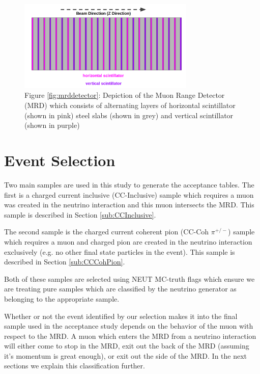 \documentclass[11pt]{article}
\begin{document}
\begin{figure}[H]
\centering
\includegraphics[width=0.75\textwidth]{EventClassifications/mrd.png}
\caption*{Figure \ref*{fig:mrddetector}: Depiction of the Muon Range Detector (MRD) which consists of alternating layers of horizontal scintillator (shown in pink) steel slabs (shown in grey) and vertical scintillator (shown in purple)}
\end{figure}\label{fig:mrddetector}



\section{Event Selection}\label{sec:eventselection}
Two main samples are used in this study to generate the acceptance tables. The first is a charged current inclusive (CC-Inclusive) sample which requires a muon was created in the neutrino interaction and this muon intersects the MRD. This sample is described in Section \ref*{sub:CCInclusive}.

The second sample is the charged current coherent pion (CC-Coh $\pi^{+/-}$) sample which requires a muon and charged pion are created in the neutrino interaction exclusively (e.g. no other final state particles in the event). This sample is described in Section \ref*{sub:CCCohPion}.

Both of these samples are selected using NEUT MC-truth flags which ensure we are treating pure samples which are classified by the neutrino generator as belonging to the appropriate sample.

Whether or not the event identified by our selection makes it into the final sample used in the acceptance study depends on the behavior of the muon with respect to the MRD. A muon which enters the MRD from a neutrino interaction will either come to stop in the MRD, exit out the back of the MRD (assuming it's momentum is great enough), or exit out the side of the MRD. In the next sections we explain this classification further.
\end{document}
